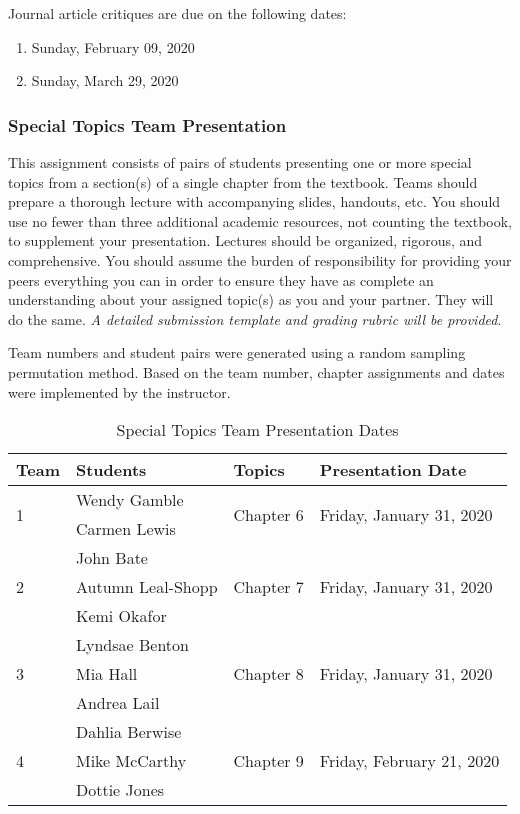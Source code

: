 \documentclass[
]{article}
\providecommand{\tightlist}{%
  \setlength{\itemsep}{0pt}\setlength{\parskip}{0pt}}
\begin{document}
Journal article critiques are due on the following dates:

\begin{enumerate}
\def\labelenumi{\arabic{enumi}.}
\tightlist
\item
  Sunday, February 09, 2020
\item
  Sunday, March 29, 2020
\end{enumerate}

\subsubsection{Special Topics Team Presentation}

This assignment consists of pairs of students presenting one or more
special topics from a section(s) of a single chapter from the textbook.
Teams should prepare a thorough lecture with accompanying slides,
handouts, etc. You should use no fewer than three additional academic
resources, not counting the textbook, to supplement your presentation.
Lectures should be organized, rigorous, and comprehensive. You should
assume the burden of responsibility for providing your peers everything
you can in order to ensure they have as complete an understanding about
your assigned topic(s) as you and your partner. They will do the same.
\emph{A detailed submission template and grading rubric will be
provided}.

Team numbers and student pairs were generated using a random sampling
permutation method. Based on the team number, chapter assignments and
dates were implemented by the instructor.

\begin{table}[H]
\begin{center}
\caption{Special Topics Team Presentation Dates}
\vspace{3mm}
\begin{tabular}{llll}
\hline
\textbf{Team} & \textbf{Students} & \textbf{Topics} & \textbf{Presentation Date} \\
\hline
\multirow{2}{*}{1} & Wendy Gamble & \multirow{2}{*}{Chapter 6} & \multirow{2}{*}{Friday, January 31, 2020} \\
 & Carmen Lewis &  &  \\
\hline
\multirow{3}{*}{2} & John Bate & \multirow{3}{*}{Chapter 7} & \multirow{3}{*}{Friday, January 31, 2020} \\
& Autumn Leal-Shopp &  &  \\
& Kemi Okafor &  &  \\
\hline
\multirow{3}{*}{3} & Lyndsae Benton & \multirow{3}{*}{Chapter 8} & \multirow{3}{*}{Friday, January 31, 2020} \\
& Mia Hall &  & \\
& Andrea Lail &  & \\
\hline
\multirow{3}{*}{4} & Dahlia Berwise & \multirow{3}{*}{Chapter 9} & \multirow{3}{*}{Friday, February 21, 2020} \\
& Mike McCarthy &  &  \\
& Dottie Jones &   & \\
\hline
\end{tabular}
\end{center}
\end{table}
\end{document}
